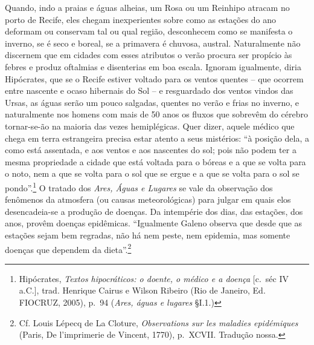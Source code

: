 Quando, indo a praias e águas alheias, um Rosa ou um Reinhipo atracam no
porto de Recife, eles chegam inexperientes sobre como as estações do ano
deformam ou conservam tal ou qual região, desconhecem como se manifesta
o inverno, se é seco e boreal, se a primavera é chuvosa, austral.
Naturalmente não discernem que em cidades com esses atributos o verão
procura ser propício às febres e produz oftalmias e disenterias em boa
escala. Ignoram igualmente, diria Hipócrates, que se o Recife estiver
voltado para os ventos quentes -- que ocorrem entre nascente e ocaso
hibernais do Sol -- e resguardado dos ventos vindos das Ursas, as águas
serão um pouco salgadas, quentes no verão e frias no inverno, e
naturalmente nos homens com mais de 50 anos os fluxos que sobrevêm do
cérebro tornar-se-ão na maioria das vezes hemiplégicas. Quer dizer,
aquele médico que chega em terra estrangeira precisa estar atento a seus
mistérios: ``à posição dela, a como está assentada, e aos ventos e aos
nascentes do sol; pois não podem ter a mesma propriedade a cidade que
está voltada para o bóreas e a que se volta para o noto, nem a que se
volta para o sol que se ergue e a que se volta para o sol se
pondo''.\footnote{Hipócrates, \emph{Textos hipocráticos: o doente, o
  médico e a doença} {[}c.~séc IV a.C.{]}, trad. Henrique Cairus e
  Wilson Ribeiro (Rio de Janeiro, Ed. FIOCRUZ, 2005), p.~94 (\emph{Ares,
  águas e lugares} §I.1.)} O tratado dos \emph{Ares, Águas e Lugares} se
vale da observação dos fenômenos da atmosfera (ou causas meteorológicas)
para julgar em quais elos desencadeia-se a produção de doenças. Da
intempérie dos dias, das estações, dos anos, provêm doenças epidêmicas.
``Igualmente Galeno observa que desde que as estações sejam bem
regradas, não há nem peste, nem epidemia, mas somente doenças que
dependem da dieta''.\footnote{Cf. Louis Lépecq de La Cloture,
  \emph{Observations sur les maladies epidémiques} (Paris, De
  l'imprimerie de Vincent, 1770), p.~XCVII. Tradução nossa.}

